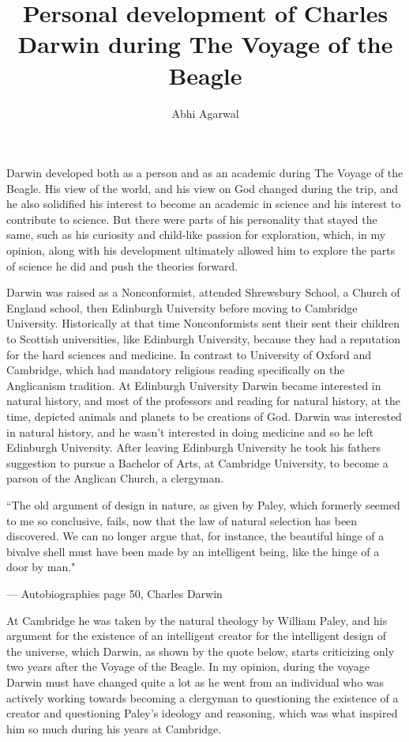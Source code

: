 \documentclass[11pt, oneside]{article}
\title{Personal development of Charles Darwin during The Voyage of the Beagle}
\author{Abhi Agarwal}
\date{}
\begin{document}
\maketitle


\par Darwin developed both as a person and as an academic during The Voyage of the Beagle. His view of the world, and his view on God changed during the trip, and he also solidified his interest to become an academic in science and his interest to contribute to science. But there were parts of his personality that stayed the same, such as his curiosity and child-like passion for exploration, which, in my opinion, along with his development ultimately allowed him to explore the parts of science he did and push the theories forward.


\par Darwin was raised as a Nonconformist, attended Shrewsbury School, a Church of England school, then Edinburgh University before moving to Cambridge University. Historically at that time Nonconformists sent their sent their children to Scottish universities, like Edinburgh University, because they had a reputation for the hard sciences and medicine. In contrast to University of Oxford and Cambridge, which had mandatory religious reading specifically on the Anglicanism tradition. At Edinburgh University Darwin became interested in natural history, and most of the professors and reading for natural history, at the time, depicted animals and planets to be creations of God. Darwin was interested in natural history, and he wasn't interested in doing medicine and so he left Edinburgh University. After leaving Edinburgh University he took his fathers suggestion to pursue a Bachelor of Arts, at Cambridge University, to become a parson of the Anglican Church, a clergyman.

\epigraph{``The old argument of design in nature, as given by Paley, which formerly seemed to me so conclusive, fails, now that the law of natural selection has been discovered. We can no longer argue that, for instance, the beautiful hinge of a bivalve shell must have been made by an intelligent being, like the hinge of a door by man."}{--- \textup{Autobiographies page 50, Charles Darwin}}

\par At Cambridge he was taken by the natural theology by William Paley, and his argument for the existence of an intelligent creator for the intelligent design of the universe, which Darwin, as shown by the quote below, starts criticizing only two years after the Voyage of the Beagle. In my opinion, during the voyage Darwin must have changed quite a lot as he went from an individual who was actively working towards becoming a clergyman to questioning the existence of a creator and questioning Paley's ideology and reasoning, which was what inspired him so much during his years at Cambridge.
\end{document}
